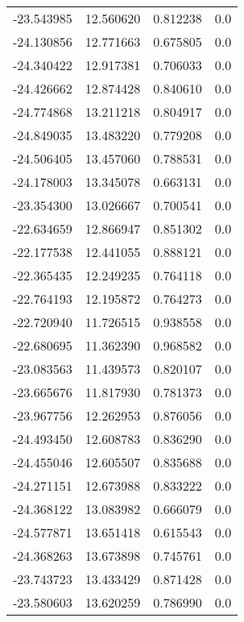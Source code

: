 \begin{tabular}{rrrr}
      -23.543985 &        12.560620 &    0.812238 &   0.0 \\
      -24.130856 &        12.771663 &    0.675805 &   0.0 \\
      -24.340422 &        12.917381 &    0.706033 &   0.0 \\
      -24.426662 &        12.874428 &    0.840610 &   0.0 \\
      -24.774868 &        13.211218 &    0.804917 &   0.0 \\
      -24.849035 &        13.483220 &    0.779208 &   0.0 \\
      -24.506405 &        13.457060 &    0.788531 &   0.0 \\
      -24.178003 &        13.345078 &    0.663131 &   0.0 \\
      -23.354300 &        13.026667 &    0.700541 &   0.0 \\
      -22.634659 &        12.866947 &    0.851302 &   0.0 \\
      -22.177538 &        12.441055 &    0.888121 &   0.0 \\
      -22.365435 &        12.249235 &    0.764118 &   0.0 \\
      -22.764193 &        12.195872 &    0.764273 &   0.0 \\
      -22.720940 &        11.726515 &    0.938558 &   0.0 \\
      -22.680695 &        11.362390 &    0.968582 &   0.0 \\
      -23.083563 &        11.439573 &    0.820107 &   0.0 \\
      -23.665676 &        11.817930 &    0.781373 &   0.0 \\
      -23.967756 &        12.262953 &    0.876056 &   0.0 \\
      -24.493450 &        12.608783 &    0.836290 &   0.0 \\
      -24.455046 &        12.605507 &    0.835688 &   0.0 \\
      -24.271151 &        12.673988 &    0.833222 &   0.0 \\
      -24.368122 &        13.083982 &    0.666079 &   0.0 \\
      -24.577871 &        13.651418 &    0.615543 &   0.0 \\
      -24.368263 &        13.673898 &    0.745761 &   0.0 \\
      -23.743723 &        13.433429 &    0.871428 &   0.0 \\
      -23.580603 &        13.620259 &    0.786990 &   0.0 \\

\end{tabular}
